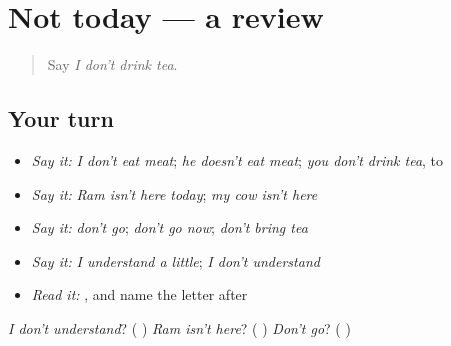 \section[(dialogue)]{Not today — a review}

\label{lesson:MW-R157-not-today}



\begin{quote}
Say \emph{I don't drink tea}.
\end{quote}

\subsection*{Your turn}
\begin{itemize}
\raggedright
  \item \emph{Say it:} \emph{I don't eat meat}; \emph{he doesn't eat meat}; \emph{you don't drink tea}, to \textbf{}
  \item \emph{Say it:} \emph{Ram isn't here today}; \emph{my cow isn't here}
  \item \emph{Say it:} \emph{don't go}; \emph{don't go now}; \emph{don't bring tea}
  \item \emph{Say it:} \emph{I understand a little}; \emph{I don't understand}
  \item \emph{Read it:} \textbf{}, and name the letter after \textbf{}
\end{itemize}

\begin{tcolorbox}[breakable,colback=teal!4,colframe=teal!35!black,title={Before you move on}]
\emph{I don't understand}? (\textbf{  }) \emph{Ram isn't here}? (\textbf{  }) \emph{Don't go}? (\textbf{ })
\end{tcolorbox}
